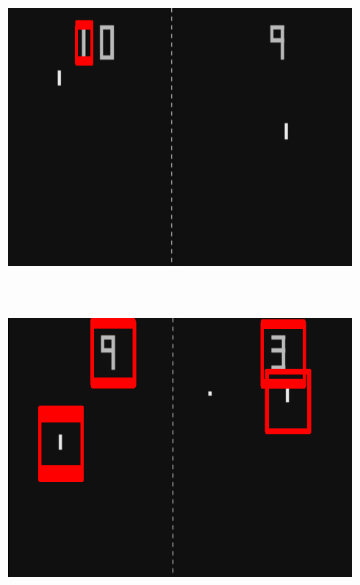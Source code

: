 \documentclass{report}
\begin{document}
\begin{figure}
    \begin{subfigure}{\linewidth}
        \centering
        \includegraphics[height=0.26\textheight]{tempLow.png}
    \end{subfigure}
    \\[1em]
    \begin{subfigure}{\linewidth}
        \centering
        \includegraphics[height=0.26\textheight]{tempMed.png}
    \end{subfigure}
    \\[1em]
    \begin{subfigure}{\linewidth}
        \centering

\end{subfigure}
\end{figure}
\end{document}
